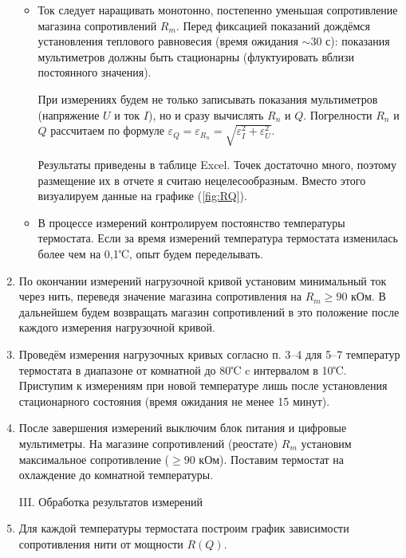 \documentclass[a4paper,12pt]{article} %
\begin{document}
\begin{enumerate}
\begin{itemize}
      \item Ток следует наращивать монотонно, постепенно уменьшая сопротивление магазина сопротивлений $R_m$. Перед фиксацией показаний дождёмся установления теплового равновесия (время ожидания $\sim 30$ с): показания мультиметров должны быть стационарны (флуктуировать вблизи постоянного значения). 
      
      При измерениях будем не только записывать показания мультиметров (напряжение $U$ и ток $I$), но и сразу вычислять $R_n$ и $Q$. Погрелности $R_n$ и $Q$ рассчитаем по формуле $\varepsilon_Q = \varepsilon_{R_n} = \sqrt{\varepsilon_I^2 + \varepsilon_U^2}$.
      
      Результаты приведены в таблице Excel. Точек достаточно много, поэтому размещение их в отчете я считаю нецелесообразным. Вместо этого визуалируем данные на графике (\ref{fig:RQ}).
      
      \item В процессе измерений контролируем постоянство температуры термостата. Если за время измерений температура термостата изменилась более чем на 0,1℃, опыт будем переделывать. 
    \end{itemize}

    \item По окончании измерений нагрузочной кривой установим минимальный ток через нить, переведя значение магазина сопротивления на $R_m \geqslant 90$ кОм. В дальнейшем будем возвращать магазин сопротивлений в это положение после каждого измерения нагрузочной кривой.
    
    \item Проведём измерения нагрузочных кривых согласно п. 3–4 для 5–7 температур термостата в диапазоне от комнатной до 80℃ c интервалом в 10℃. Приступим к измерениям при новой температуре лишь после установления стационарного состояния (время ожидания не менее 15 минут).
    
    \item После завершения измерений выключим блок питания и цифровые мультиметры. На магазине сопротивлений (реостате) $R_m$ установим максимальное сопротивление ($\geqslant 90$ кОм). Поставим термостат на охлаждение до комнатной температуры.

\begin{center}
  \textsf{III. Обработка результатов измерений}
\end{center}

    \item Для каждой температуры термостата построим график зависимости сопротивления нити от мощности $R(Q)$. 
    

\end{enumerate}
\end{document}
